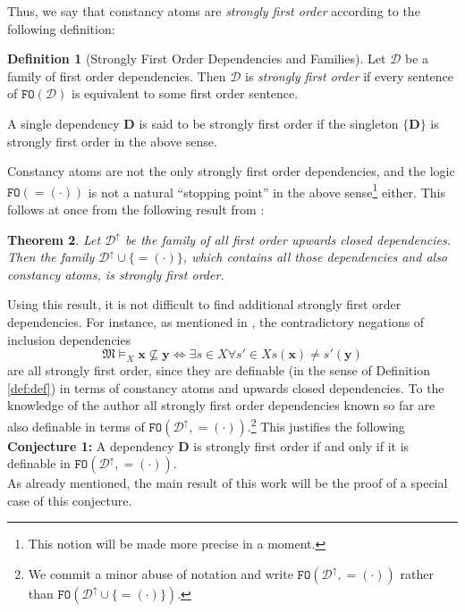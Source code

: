 \documentclass{article}
\newtheorem{Theorem}{Theorem}[section]
\theoremstyle{definition}
\newtheorem{Definition}[Theorem]{Definition}
\newcommand{\tuple}{\mathbf}
\newcommand{\FO}{\texttt{FO}}
\newcommand{\M}{\mathfrak M}
\newcommand{\D}{\mathbf D}
\newcommand{\DD}{\mathcal D}
\begin{document}
Thus, we say that constancy atoms are \emph{strongly first order} according to the following definition:
\begin{Definition}[Strongly First Order Dependencies and Families]
Let $\DD$ be a family of first order dependencies. Then $\DD$ is \emph{strongly first order} if every sentence of $\FO(\DD)$ is equivalent to some first order sentence. 

A single dependency $\D$ is said to be strongly first order if the singleton $\{\D\}$ is strongly first order in the above sense. 
\label{def:stronglyFO}
\end{Definition}

Constancy atoms are not the only strongly first order dependencies, and the logic $\FO(=\!\!(\cdot))$ is not a natural ``stopping point'' in the above sense\footnote{This notion will be made more precise in a moment.} either. This follows at once from the following result from \cite{galliani2015upwards}: 
\begin{Theorem}
Let $\DD^\uparrow$ be the family of all first order upwards closed dependencies. Then the family $\DD^\uparrow \cup \{=\!\!(\cdot)\}$, which contains all those dependencies and also constancy atoms, is strongly first order. 
\label{thm:upwards}
\end{Theorem}
Using this result, it is not difficult to find additional strongly first order dependencies. For instance, as mentioned in \cite{galliani2015upwards}, the contradictory negations of inclusion dependencies 
\[
	\M \models_X \tuple x \not \subseteq \tuple y \Leftrightarrow \exists s \in X \forall s' \in X s(\tuple x) \not = s'(\tuple y)
\]
are all strongly first order, since they are definable (in the sense of Definition \ref{def:def}) in terms of constancy atoms and upwards closed dependencies. To the knowledge of the author all strongly first order dependencies known so far are also definable in terms of $\FO(\DD^\uparrow, =\!\!(\cdot))$.\footnote{We commit a minor abuse of notation and write  $\FO(\DD^\uparrow, =\!\!(\cdot))$ rather than  $\FO(\DD^\uparrow \cup \{=\!\!(\cdot)\})$.} This justifies the following\\

\noindent\textbf{Conjecture 1:} A dependency $\D$ is strongly first order if and only if it is definable in $\FO(\DD^\uparrow, =\!\!(\cdot))$.\\

As already mentioned, the main result of this work will be the proof of a special case of this conjecture. \\
\end{document}
